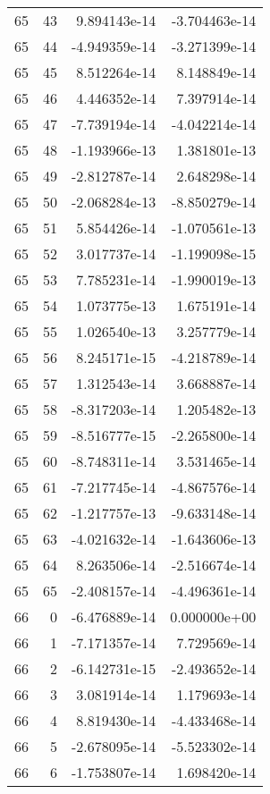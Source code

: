 \begin{tabular}{rrrr}
  65 &   43 &  9.894143e-14 & -3.704463e-14 \\
  65 &   44 & -4.949359e-14 & -3.271399e-14 \\
  65 &   45 &  8.512264e-14 &  8.148849e-14 \\
  65 &   46 &  4.446352e-14 &  7.397914e-14 \\
  65 &   47 & -7.739194e-14 & -4.042214e-14 \\
  65 &   48 & -1.193966e-13 &  1.381801e-13 \\
  65 &   49 & -2.812787e-14 &  2.648298e-14 \\
  65 &   50 & -2.068284e-13 & -8.850279e-14 \\
  65 &   51 &  5.854426e-14 & -1.070561e-13 \\
  65 &   52 &  3.017737e-14 & -1.199098e-15 \\
  65 &   53 &  7.785231e-14 & -1.990019e-13 \\
  65 &   54 &  1.073775e-13 &  1.675191e-14 \\
  65 &   55 &  1.026540e-13 &  3.257779e-14 \\
  65 &   56 &  8.245171e-15 & -4.218789e-14 \\
  65 &   57 &  1.312543e-14 &  3.668887e-14 \\
  65 &   58 & -8.317203e-14 &  1.205482e-13 \\
  65 &   59 & -8.516777e-15 & -2.265800e-14 \\
  65 &   60 & -8.748311e-14 &  3.531465e-14 \\
  65 &   61 & -7.217745e-14 & -4.867576e-14 \\
  65 &   62 & -1.217757e-13 & -9.633148e-14 \\
  65 &   63 & -4.021632e-14 & -1.643606e-13 \\
  65 &   64 &  8.263506e-14 & -2.516674e-14 \\
  65 &   65 & -2.408157e-14 & -4.496361e-14 \\
  66 &    0 & -6.476889e-14 &  0.000000e+00 \\
  66 &    1 & -7.171357e-14 &  7.729569e-14 \\
  66 &    2 & -6.142731e-15 & -2.493652e-14 \\
  66 &    3 &  3.081914e-14 &  1.179693e-14 \\
  66 &    4 &  8.819430e-14 & -4.433468e-14 \\
  66 &    5 & -2.678095e-14 & -5.523302e-14 \\
  66 &    6 & -1.753807e-14 &  1.698420e-14 \\

\end{tabular}
